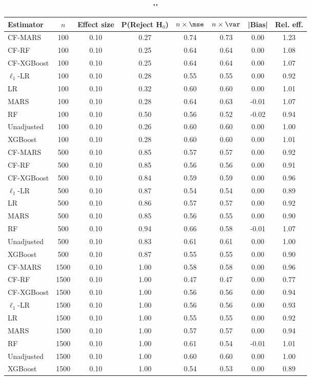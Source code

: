 \begin{table}
\centering
\caption{""}
\begin{tabular}{lccccccc}
\toprule
Estimator & $n$ & Effect size & P(Reject H$_0$) & $n\times\mse$ & $n\times \var$ & |Bias| & Rel. eff.\\ \midrule
CF-MARS & 100 & 0.10 & 0.27 & 0.74 & 0.73 &  0.00 & 1.23 \\ 
CF-RF & 100 & 0.10 & 0.25 & 0.64 & 0.64 &  0.00 & 1.08 \\ 
CF-XGBoost & 100 & 0.10 & 0.25 & 0.64 & 0.64 &  0.00 & 1.07 \\ 
$\ell_1$-LR & 100 & 0.10 & 0.28 & 0.55 & 0.55 &  0.00 & 0.92 \\ 
LR & 100 & 0.10 & 0.32 & 0.60 & 0.60 &  0.00 & 1.01 \\ 
MARS & 100 & 0.10 & 0.28 & 0.64 & 0.63 & -0.01 & 1.07 \\ 
RF & 100 & 0.10 & 0.50 & 0.56 & 0.52 & -0.02 & 0.94 \\ 
Unadjusted & 100 & 0.10 & 0.26 & 0.60 & 0.60 &  0.00 & 1.00 \\ 
XGBoost & 100 & 0.10 & 0.28 & 0.60 & 0.60 &  0.00 & 1.01 \\ \addlinespace 
CF-MARS & 500 & 0.10 & 0.85 & 0.57 & 0.57 &  0.00 & 0.92 \\ 
CF-RF & 500 & 0.10 & 0.85 & 0.56 & 0.56 &  0.00 & 0.91 \\ 
CF-XGBoost & 500 & 0.10 & 0.84 & 0.59 & 0.59 &  0.00 & 0.96 \\ 
$\ell_1$-LR & 500 & 0.10 & 0.87 & 0.54 & 0.54 &  0.00 & 0.89 \\ 
LR & 500 & 0.10 & 0.86 & 0.57 & 0.57 &  0.00 & 0.92 \\ 
MARS & 500 & 0.10 & 0.85 & 0.56 & 0.55 &  0.00 & 0.90 \\ 
RF & 500 & 0.10 & 0.94 & 0.66 & 0.58 & -0.01 & 1.07 \\ 
Unadjusted & 500 & 0.10 & 0.83 & 0.61 & 0.61 &  0.00 & 1.00 \\ 
XGBoost & 500 & 0.10 & 0.87 & 0.55 & 0.55 &  0.00 & 0.90 \\ \addlinespace 
CF-MARS & 1500 & 0.10 & 1.00 & 0.58 & 0.58 &  0.00 & 0.96 \\ 
CF-RF & 1500 & 0.10 & 1.00 & 0.47 & 0.47 &  0.00 & 0.77 \\ 
CF-XGBoost & 1500 & 0.10 & 1.00 & 0.56 & 0.56 &  0.00 & 0.94 \\ 
$\ell_1$-LR & 1500 & 0.10 & 1.00 & 0.56 & 0.56 &  0.00 & 0.93 \\ 
LR & 1500 & 0.10 & 1.00 & 0.55 & 0.55 &  0.00 & 0.92 \\ 
MARS & 1500 & 0.10 & 1.00 & 0.57 & 0.57 &  0.00 & 0.94 \\ 
RF & 1500 & 0.10 & 1.00 & 0.61 & 0.54 & -0.01 & 1.01 \\ 
Unadjusted & 1500 & 0.10 & 1.00 & 0.60 & 0.60 &  0.00 & 1.00 \\ 
XGBoost & 1500 & 0.10 & 1.00 & 0.54 & 0.53 &  0.00 & 0.89 \\
\bottomrule
\end{tabular}
\end{table}

